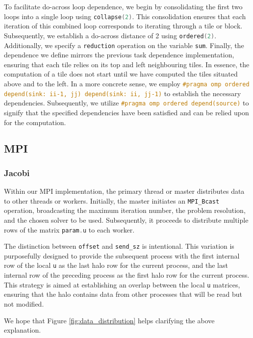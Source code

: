 \documentclass[titlepage]{article}
\newcommand{\incode}[1]{\lstinline[style=inlineC,language=C]{#1}}
\begin{document}
To facilitate do-across loop dependence, we begin by consolidating the first two loops into a single loop using \incode{collapse(2)}. This consolidation ensures that each iteration of this combined loop corresponds to iterating through a tile or block. Subsequently, we establish a do-across distance of 2 using \incode{ordered(2)}. Additionally, we specify a \incode{reduction} operation on the variable \incode{sum}. Finally, the dependence we define mirrors the previous task dependence implementation, ensuring that each tile relies on its top and left neighbouring tiles. In essence, the computation of a tile does not start until we have computed the tiles situated above and to the left. In a more concrete sense, we employ \incode{#pragma omp ordered  depend(sink: ii-1, jj) depend(sink: ii, jj-1)} to establish the necessary dependencies. Subsequently, we utilize \incode{#pragma omp ordered depend(source)} to signify that the specified dependencies have been satisfied and can be relied upon for the computation.

\subsection{MPI}

\subsubsection{Jacobi}


Within our MPI implementation, the primary thread or master distributes data to other threads or workers. Initially, the master initiates an \incode{MPI_Bcast} operation, broadcasting the maximum iteration number, the problem resolution, and the chosen solver to be used. Subsequently, it proceeds to distribute multiple rows of the matrix \incode{param.u} to each worker.

The distinction between \incode{offset} and \incode{send_sz} is intentional. This variation is purposefully designed to provide the subsequent process with the first internal row of the local \incode{u} as the last halo row for the current process, and the last internal row of the preceding process as the first halo row for the current process. This strategy is aimed at establishing an overlap between the local \incode{u} matrices, ensuring that the halo contains data from other processes that will be read but not modified.

We hope that Figure \ref{fig:data_distribution} helps clarifying the above explanation.
\end{document}

